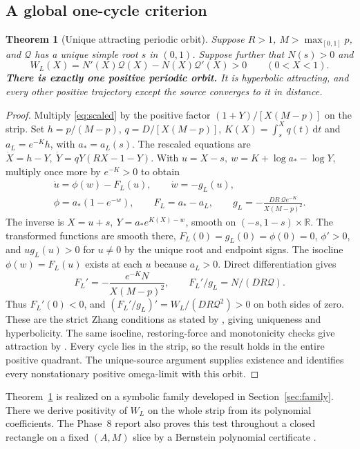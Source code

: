 \documentclass[12pt,a4paper,twoside,fleqn]{article}
\theoremstyle{journal}
\newtheorem{theorem}{Theorem}
\newcommand{\claim}[1]{{\normalfont\bfseries\boldmath #1}}
\newcommand{\dd}{\mathrm{d}}
\newcommand{\Q}{\mathcal Q}
\begin{document}
\subsection{A global one-cycle criterion}\label{sec:onecycle}
\begin{theorem}[Unique attracting periodic orbit]\label{thm:cycle}
Suppose \(R>1\), \(M>\max_{[0,1]}p\), and \(\Q\) has a unique simple root \(s\) in \((0,1)\). Suppose further that \(N(s)>0\) and
\[
 W_L(X)=N'(X)\Q(X)-N(X)\Q'(X)>0\qquad(0<X<1).
\]
\claim{There is exactly one positive periodic orbit.} It is hyperbolic attracting, and every other positive trajectory except the source converges to it in distance.
\end{theorem}
\begin{proof}
Multiply \eqref{eq:scaled} by the positive factor \((1+Y)/[X(M-p)]\) on the strip. Set \(h=p/(M-p)\), \(q=D/[X(M-p)]\), \(K(X)=\int_s^X q(t)\,\dd t\) and \(a_L=e^{-K}h\), with \(a_*=a_L(s)\). The rescaled equations are \(\dot X=h-Y,\ \dot Y=qY(RX-1-Y)\). With \(u=X-s,\ w=K+\log a_*-\log Y\), multiply once more by \(e^{-K}>0\) to obtain
\[
 \begin{gathered}
 \dot u=\phi(w)-F_L(u),\qquad \dot w=-g_L(u),\\
 \phi=a_*(1-e^{-w}),\qquad F_L=a_*-a_L,\qquad
 g_L=-\frac{DR\,\Q e^{-K}}{X(M-p)^2}.
 \end{gathered}
\]
The inverse is \(X=u+s,\ Y=a_* e^{K(X)-w}\), smooth on \((-s,1-s)\times\mathbb R\). The transformed functions are smooth there, \(F_L(0)=g_L(0)=\phi(0)=0\), \(\phi'>0\), and \(ug_L(u)>0\) for \(u\ne0\) by the unique root and endpoint signs. The isocline \(\phi(w)=F_L(u)\) exists at each \(u\) because \(a_L>0\). Direct differentiation gives
\[
 F_L'=-\frac{e^{-K}N}{X(M-p)^2},\qquad
 F_L'/g_L=N/(DR\Q).
\]
Thus \(F_L'(0)<0\), and \((F_L'/g_L)'=W_L/(DR\Q^2)>0\) on both sides of zero. These are the strict Zhang conditions as stated by \citet[Lemma~1]{zegeling93}, giving uniqueness and hyperbolicity. The same isocline, restoring-force and monotonicity checks give attraction by \citet[Theorem~4.1]{wang11}. Every cycle lies in the strip, so the result holds in the entire positive quadrant. The unique-source argument supplies existence and identifies every nonstationary positive omega-limit with this orbit.
\end{proof}

Theorem~\ref{thm:cycle} is realized on a symbolic family developed in Section~\ref{sec:family}. There we derive positivity of \(W_L\) on the whole strip from its polynomial coefficients. The Phase~8 report also proves this test throughout a closed rectangle on a fixed \((A,M)\) slice by a Bernstein polynomial certificate \citep[p.~24, P8-U3/U6]{phase8}.
\end{document}
